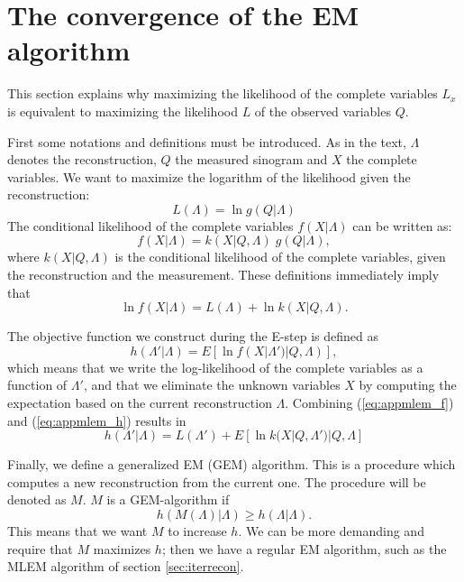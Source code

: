 \documentclass[11pt,oneside]{book}
\begin{document}
\newpage
\section{The convergence of the EM algorithm} \label{app:em}
This section explains why maximizing the likelihood of the complete variables
$L_x$ is equivalent to maximizing the likelihood $L$ of the observed variables
$Q$.

First some notations and definitions must be introduced. As in the text,
$\Lambda$ denotes the reconstruction, $Q$ the measured sinogram and $X$ the
complete variables. We want to maximize the logarithm of the likelihood
given the reconstruction:
\begin{equation}
  L(\Lambda) = \ln g(Q | \Lambda)
\end{equation}
The conditional likelihood of the complete variables $f(X | \Lambda)$  can be
written as:
\begin{equation}
  f(X | \Lambda) = k(X | Q, \Lambda) \; g(Q | \Lambda),
\end{equation}
where $k(X | Q, \Lambda)$ is the conditional likelihood of the complete
variables, given the reconstruction and the measurement. These definitions
immediately  imply that
\begin{equation}
  \ln f(X | \Lambda) = L(\Lambda) + \ln k(X | Q, \Lambda). \label{eq:appmlem_f}
\end{equation}

The objective function we construct during the E-step is defined as
\begin{equation}
  h(\Lambda' | \Lambda) = E\left[\ln f(X | \Lambda') | Q, \Lambda)\right],
      \label{eq:appmlem_h}
\end{equation}
which means that we write the log-likelihood of the complete variables as a
function of $\Lambda'$, and that we eliminate the unknown variables $X$ by
computing the expectation based on the current reconstruction $\Lambda$.
Combining (\ref{eq:appmlem_f}) and (\ref{eq:appmlem_h}) results in
\begin{equation}
  h(\Lambda' | \Lambda) = L(\Lambda') + E\left[\ln k(X | Q, \Lambda') | Q,\Lambda\right]
   \label{eq:appmlem_h2}
\end{equation}

Finally, we define a generalized EM (GEM) algorithm. This is a procedure which
computes a new reconstruction from the current one. The procedure will be
denoted as $M$. $M$ is a GEM-algorithm if
\begin{equation}
  h(M(\Lambda) | \Lambda) \geq h(\Lambda | \Lambda).
\end{equation}
This means that we want $M$ to increase $h$. We can be more demanding and
require that $M$ maximizes $h$; then we have a regular EM algorithm, such as
the MLEM algorithm of section \ref{sec:iterrecon}.
\end{document}
